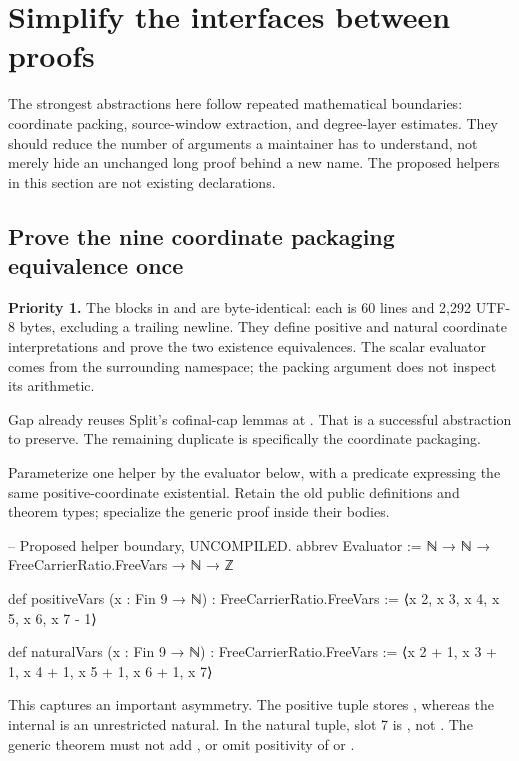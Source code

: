 \majorbreak
\section{Simplify the interfaces between proofs}
\label{sec:architecture}

The strongest abstractions here follow repeated mathematical boundaries:
coordinate packing, source-window extraction, and degree-layer estimates.
They should reduce the number of arguments a maintainer has to understand,
not merely hide an unchanged long proof behind a new name. The proposed
helpers in this section are not existing declarations.

\subsection{Prove the nine coordinate packaging equivalence once}
\label{sec:nine}

\textbf{Priority 1.} The blocks in
 and
 are byte-identical: each is 60 lines
and 2,292 UTF-8 bytes, excluding a trailing newline. They define positive and
natural coordinate interpretations and prove the two existence equivalences.
The scalar evaluator comes from the surrounding namespace; the packing
argument does not inspect its arithmetic.

\existing{} Gap already reuses Split's cofinal-cap lemmas at
. That is a successful abstraction to
preserve. The remaining duplicate is specifically the coordinate packaging.

\proposed{} Parameterize one helper by the evaluator below, with a predicate
 expressing the same positive-coordinate existential. Retain
the old public definitions and theorem types; specialize the generic proof
inside their bodies.

\begin{Lean}
-- Proposed helper boundary, UNCOMPILED.
abbrev Evaluator :=
  ℕ → ℕ → FreeCarrierRatio.FreeVars → ℕ → ℤ

def positiveVars (x : Fin 9 → ℕ) : FreeCarrierRatio.FreeVars :=
  ⟨x 2, x 3, x 4, x 5, x 6, x 7 - 1⟩

def naturalVars (x : Fin 9 → ℕ) : FreeCarrierRatio.FreeVars :=
  ⟨x 2 + 1, x 3 + 1, x 4 + 1, x 5 + 1, x 6 + 1, x 7⟩
\end{Lean}

This captures an important asymmetry. The positive tuple stores
, whereas the internal  is an
unrestricted natural. In the natural tuple, slot 7 is , not
. The generic theorem must not add , or omit
positivity of  or .

